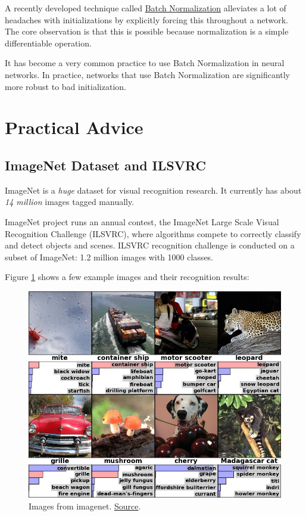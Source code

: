 \documentclass[a4paper]{tufte-handout}
\begin{document}
A recently developed technique called
\href{http://arxiv.org/abs/1502.03167}{Batch Normalization} alleviates a
lot of headaches with initializations by explicitly forcing this
throughout a network. The core observation is that this is possible
because normalization is a simple differentiable operation.

It has become a very common practice to use Batch Normalization in
neural networks. In practice, networks that use Batch Normalization are
significantly more robust to bad initialization.

\section{Practical Advice}\label{practical-advice}

\subsection{ImageNet Dataset and
ILSVRC}\label{imagenet-dataset-and-ilsvrc}

ImageNet is a \emph{huge} dataset for visual recognition research. It
currently has about \emph{14 million} images tagged manually.

ImageNet project runs an annual contest, the ImageNet Large
Scale Visual Recognition Challenge (ILSVRC), where algorithms compete
 to correctly classify and detect objects and scenes. ILSVRC
recognition challenge is conducted on a subset of ImageNet: 1.2 million
images with 1000 classes.

Figure \ref{fig:imagenet} shows a few example images and their recognition results:
\begin{figure}
\includegraphics[width=\linewidth]{imagenet.png}
\caption{Images from imagenet.
\href{http://mappingignorance.org/fx/media/2013/04/Deep-learning-5.png}{Source}.
} 
\label{fig:imagenet}
\end{figure}
\end{document}
